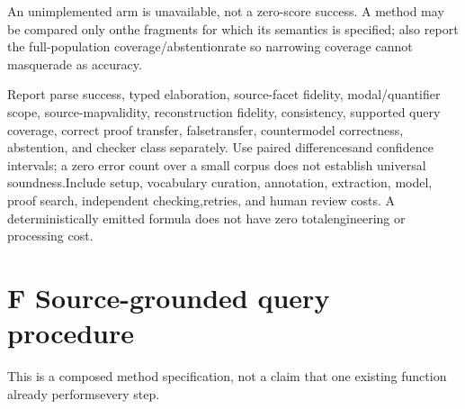 \noindent
An unimplemented arm is unavailable, not a zero-score success. A method may be compared only on\linebreak[4]
the fragments for which its semantics is specified; also report the full-population coverage/abstention\linebreak[4]
rate so narrowing coverage cannot masquerade as accuracy.\par


\noindent
Report parse success, typed elaboration, source-facet fidelity, modal/quantifier scope, source-map\linebreak[4]
validity, reconstruction fidelity, consistency, supported query coverage, correct proof transfer, false\linebreak[4]
transfer, countermodel correctness, abstention, and checker class separately. Use paired differences\linebreak[4]
and confidence intervals; a zero error count over a small corpus does not establish universal soundness.\linebreak[4]
Include setup, vocabulary curation, annotation, extraction, model, proof search, independent checking,\linebreak[4]
retries, and human review costs. A deterministically emitted formula does not have zero total\linebreak[4]
engineering or processing cost.\par

\section*{F  Source-grounded query procedure}
\noindent
This is a composed method specification, not a claim that one existing function already performs\linebreak[4]
every step.\par

